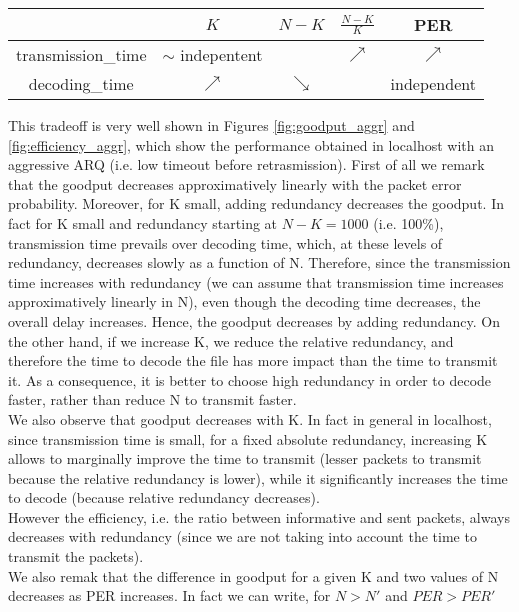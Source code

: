 \begin{center}
\begin{tabular}{ccccc}

\toprule
&$K$&$N-K$&$\frac{N-K}{K}$&PER\\
\midrule
transmission\_time&$\sim$ indepentent& & $\nearrow$&$\nearrow$\\
decoding\_time&$\nearrow$&$\searrow$&&independent\\
\bottomrule
\end{tabular}
\end{center}


This tradeoff is very well shown in Figures \ref{fig:goodput_aggr} and \ref{fig:efficiency_aggr}, which show the performance obtained in localhost with an aggressive ARQ (i.e. low timeout before retrasmission). First of all we remark that the goodput decreases approximatively linearly with the packet error probability. Moreover, for K small, adding redundancy decreases the goodput. In fact for K small and redundancy starting at $N-K=1000$ (i.e. 100\%), transmission time prevails over decoding time, which, at these levels of redundancy, decreases slowly as a function of N. Therefore, since the transmission time increases with redundancy (we can assume that transmission time increases approximatively linearly in N), even though the decoding time decreases, the overall delay increases. Hence, the goodput decreases by adding redundancy.
On the other hand, if we increase K, we reduce the relative redundancy, and therefore the time to decode the file has more impact than the time to transmit it. As a consequence, it is better to choose high redundancy in order to decode faster, rather than reduce N to transmit faster.\\
We also observe that goodput decreases with K. In fact in general in localhost, since transmission time is small, for a fixed absolute redundancy, increasing K allows to marginally improve the time to transmit (lesser packets to transmit because the relative redundancy is lower), while it significantly increases the time to decode (because relative redundancy decreases). \\
However the efficiency, i.e. the ratio between informative and sent packets, always decreases with redundancy (since we are not taking into account the time to transmit the packets).\\
We also remak that the difference in goodput for a given K and two values of N decreases as PER increases. In fact we can write, for $N>N'$ and $PER>PER'$
